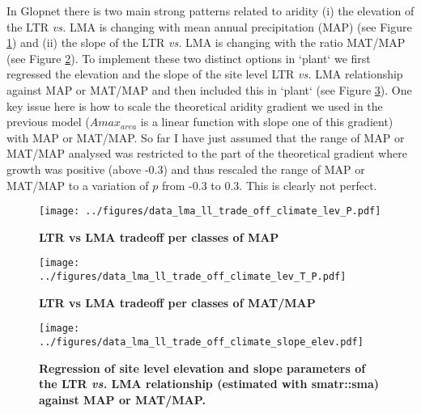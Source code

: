 \documentclass[a4paper,11pt]{article}
\begin{document}
In Glopnet there is two main strong patterns related to aridity (i) the elevation of the LTR \textit{vs.} LMA is changing with mean annual precipitation (MAP) (see Figure \ref{fig:MAP}) and (ii) the slope of the LTR \textit{vs.} LMA is changing with the ratio MAT/MAP (see Figure \ref{fig:MAT_MAP}). To implement these two distinct options in `plant` we first regressed the elevation and the slope of the site level LTR \textit{vs.} LMA relationship against MAP or MAT/MAP and then included this in `plant` (see Figure \ref{fig:elev_slope}). One key issue here is how to scale the theoretical aridity gradient we used in the previous model ($A{max}_{area}$ is a linear function with slope one of this gradient) with MAP or MAT/MAP. So far I have just assumed that the range of MAP or MAT/MAP analysed was restricted to the part of the theoretical gradient where growth was positive (above -0.3) and thus rescaled the range of MAP or MAT/MAP to a variation of $p$ from -0.3 to 0.3. This is clearly not perfect.

\begin{figure}[ht]
\centering
\texttt{[image: ../figures/data\_lma\_ll\_trade\_off\_climate\_lev\_P.pdf]}
\caption{\textbf{LTR vs LMA tradeoff per classes of MAP}
\label{fig:MAP}}
\end{figure}


\begin{figure}[ht]
\centering
\texttt{[image: ../figures/data\_lma\_ll\_trade\_off\_climate\_lev\_T\_P.pdf]}
\caption{\textbf{LTR vs LMA tradeoff per classes of MAT/MAP}
\label{fig:MAT_MAP}}
\end{figure}


\begin{figure}[ht]
\centering
\texttt{[image: ../figures/data\_lma\_ll\_trade\_off\_climate\_slope\_elev.pdf]}
\caption{\textbf{Regression of site level elevation and slope parameters of the LTR \textit{vs.} LMA relationship (estimated with smatr::sma) against MAP or MAT/MAP. }
\label{fig:elev_slope}}
\end{figure}


\end{document}
